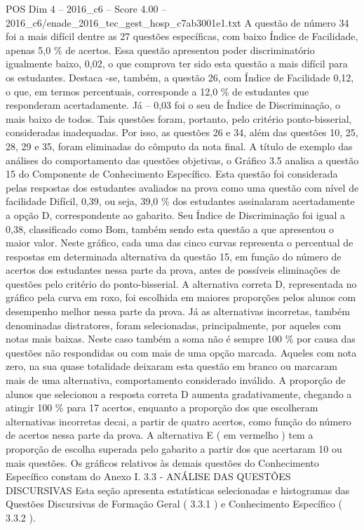 \begin{textsample}{POS Dim 4 – 2016\_c6 – Score 4.00 – 2016\_c6/enade\_2016\_tec\_gest\_hosp\_c7ab3001e1.txt}
A questão de número 34 foi a mais difícil dentre as 27 questões específicas, com baixo Índice de Facilidade, apenas 5,0 \% de acertos.
Essa questão apresentou poder discriminatório igualmente baixo, 0,02, o que comprova ter sido esta questão a mais difícil para os estudantes.
Destaca -se, também, a questão 26, com Índice de Facilidade 0,12, o que, em termos percentuais, corresponde a 12,0 \% de estudantes que responderam acertadamente.
Já – 0,03 foi o seu de Índice de Discriminação, o mais baixo de todos.
Tais questões foram, portanto, pelo critério ponto-bisserial, consideradas inadequadas.
Por isso, as questões 26 e 34, além das questões 10, 25, 28, 29 e 35, foram eliminadas do cômputo da nota final.
A título de exemplo das análises do comportamento das questões objetivas, o Gráfico 3.5 analisa a questão 15 do Componente de Conhecimento Específico.
Esta questão foi considerada pelas respostas dos estudantes avaliados na prova como uma questão com nível de facilidade Difícil, 0,39, ou seja, 39,0 \% dos estudantes assinalaram acertadamente a opção D, correspondente ao gabarito.
Seu Índice de Discriminação foi igual a 0,38, classificado como Bom, também sendo esta questão a que apresentou o maior valor.
Neste gráfico, cada uma das cinco curvas representa o percentual de respostas em determinada alternativa da questão 15, em função do número de acertos dos estudantes nessa parte da prova, antes de possíveis eliminações de questões pelo critério do ponto-bisserial.
A alternativa correta D, representada no gráfico pela curva em roxo, foi escolhida em maiores proporções pelos alunos com desempenho melhor nessa parte da prova.
Já as alternativas incorretas, também denominadas distratores, foram selecionadas, principalmente, por aqueles com notas mais baixas.
Neste caso também a soma não é sempre 100 \% por causa das questões não respondidas ou com mais de uma opção marcada.
Aqueles com nota zero, na sua quase totalidade deixaram esta questão em branco ou marcaram mais de uma alternativa, comportamento considerado inválido.
A proporção de alunos que selecionou a resposta correta D aumenta gradativamente, chegando a atingir 100 \% para 17 acertos, enquanto a proporção dos que escolheram alternativas incorretas decai, a partir de quatro acertos, como função do número de acertos nessa parte da prova.
A alternativa E ( em vermelho ) tem a proporção de escolha superada pelo gabarito a partir dos que acertaram 10 ou mais questões.
Os gráficos relativos às demais questões do Conhecimento Específico constam do Anexo I. 3.3 - ANÁLISE DAS QUESTÕES DISCURSIVAS Esta seção apresenta estatísticas selecionadas e histogramas das Questões Discursivas de Formação Geral ( 3.3.1 ) e Conhecimento Específico ( 3.3.2 ).

\end{textsample}
